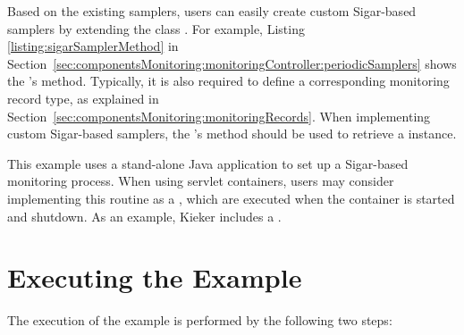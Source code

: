 \pagebreak

\setJavaCodeListing


\noindent Based on the existing samplers, users can easily create custom Sigar-based %
samplers by extending the class . For example, Listing~%
\ref{listing:sigarSamplerMethod} in Section~\ref{sec:componentsMonitoring:monitoringController:periodicSamplers} %
shows the 's  method. %
Typically, it is also required to define a corresponding monitoring record type, %
as explained in Section~\ref{sec:componentsMonitoring:monitoringRecords}. %
When implementing custom Sigar-based samplers, the 's  method should %
be used to retrieve a  instance. %

This example uses a stand-alone Java application to set up %
a Sigar-based monitoring process. When using servlet containers,  %
users may consider implementing this routine as a , %
which are executed when the container is started and shutdown. %
As an example, Kieker includes a . %

\section{Executing the Example}

The execution of the example is performed by the following two steps:\\

